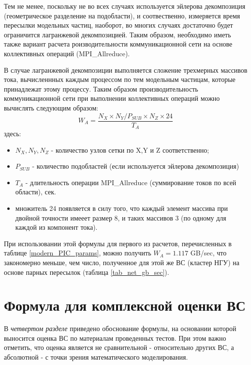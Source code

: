 \clearpage

Тем не менее, поскольку не во всех случаях используется эйлерова декомпозиция (геометрическое разделение на подобласти), и соотвественно, измеряется время пересылки модельных частиц, наоборот, во многих случаях достаточно будет ограничится лагранжевой декомпозицией. Таким образом, необходимо иметь также вариант расчета роизводительности коммуникационной сети на основе коллективных операций (MPI\_Allreduce).

В случае лагранжевой декомпозиции выполняется сложение трехмерных массивов тока, вычисленнных каждым процессом по тем модельным частицам, которые принадлежат этому процессу. Таким образом производительность коммуникационной сети при выполнении коллективных операций можно вычислять следующим образом:
$$
W_A = \frac{N_X\times N_Y/P_{SUB} \times N_Z \times 24}{T_A}
$$
здесь:
\begin{itemize}
	\item $N_X, N_Y, N_Z$ - количество узлов сетки по X,Y и Z соответственно;
	\item $P_{SUB}$ - количество подобластей (если используется эйлерова декомпозиция)
	\item $T_{A}$ - длительность операции MPI\_Allreduce (суммирование токов по всей области), сек.
	\item множитель 24 появляется в силу того, что каждый элемент массива при двойной точности имееет размер 8, и таких массивов 3 (по одному для каждой из компонент тока).
\end{itemize}	

При использовании этой формулы для первого из расчетов, перечисленных в таблице \ref{modern_PIC_params}, можно получить 
$W_A = 1.117$ GB/sec, что закономерно меньше, чем число, полученное для этой же ВС (кластер НГУ) на основе парных пересылок
(таблица \ref{tab_net_gb_sec}).





%		
%		

\section{Формула для комплексной оценки ВС}
\label{complex_evaluation}
В \textit{четвертом разделе} приведено обоснование формулы, на основании которой выносится оценка ВС по материалам проведенных тестов. При этом важно отметить, что оценка является не сравнительной - относительно других ВС, а абсолютной - с точки зрения математического моделирования. 

